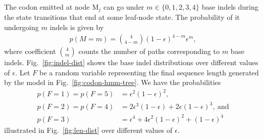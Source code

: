 \documentclass[a4paper]{article}
\theoremstyle{definition}
\theoremstyle{definition}
\theoremstyle{definition}
\newcommand{\eps}{\epsilon}
\begin{document}
The codon emitted at node $\mathrm M_j$ can go under $m\in\{0, 1, 2, 3, 4\}$ base indels during
the state transitions that end at some leaf-node state.
The probability of it undergoing $m$ indels is given by
\begin{align*}
    p(M=m) = \binom{4}{4-m} (1 - \eps)^{4-m} \eps^m,
\end{align*}
where coefficient $\binom{4}{m}$ counts the number of paths corresponding to $m$ base indels.
Fig.~\ref{fig:indel-dist} shows the base indel distributions over different values of $\eps$.
Let $F$ be a random variable representing the final sequence length generated by the model in
Fig.~\ref{fig:codon-hmm-tree}.
We have the probabilities
\begin{align*}
    p(F=1) = p(F=5) &= \eps^2(1-\eps)^2, \\
    p(F=2) = p(F=4) &= 2\eps^3(1-\eps) + 2\eps(1-\eps)^3,~\text{and} \\
    p(F=3)          &= \eps^4 + 4\eps^2(1-\eps)^2 + (1-\eps)^4
\end{align*}
illustrated in Fig.~\ref{fig:len-dist} over different values of $\eps$.
\end{document}

